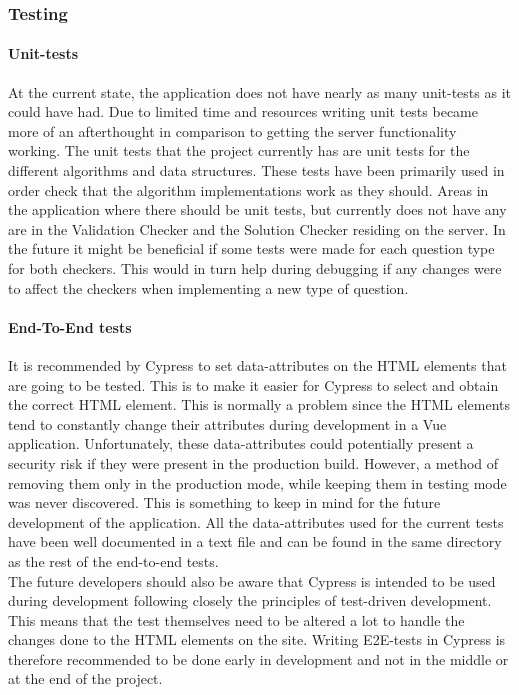 \subsubsection{Testing}
\paragraph{Unit-tests}
At the current state, the application does not have nearly as many unit-tests as it could have had. Due to limited time and resources writing unit tests became more of an afterthought in comparison to getting the server functionality working. The unit tests that the project currently has are unit tests for the different algorithms and data structures. These tests have been primarily used in order check that the algorithm implementations work as they should. Areas in the application where there should be unit tests, but currently does not have any are in the Validation Checker and the Solution Checker residing on the server. In the future it might be beneficial if some tests were made for each question type for both checkers. This would in turn help during debugging if any changes were to affect the checkers when implementing a new type of question.
\paragraph{End-To-End tests}
It is recommended by Cypress to set data-attributes on the HTML elements that are going to be tested. This is to make it easier for Cypress to select and obtain the correct HTML element. This is normally a problem since the HTML elements tend to constantly change their attributes during development in a Vue application. Unfortunately, these data-attributes could potentially present a security risk if they were present in the production build. However, a method of removing them only in the production mode, while keeping them in testing mode was never discovered. This is something to keep in mind for the future development of the application. All the data-attributes used for the current tests have been well documented in a text file and can be found in the same directory as the rest of the end-to-end tests.\cite{Cypress:BestPractise}
\\[11pt] 
The future developers should also be aware that Cypress is intended to be used during development following closely the principles of test-driven development. This means that the test themselves need to be altered a lot to handle the changes done to the HTML elements on the site. Writing E2E-tests in Cypress is therefore recommended to be done early in development and not in the middle or at the end of the project.

